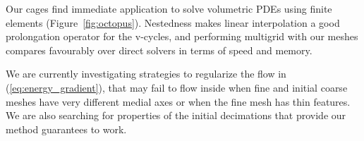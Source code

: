 \documentclass{cgyrf15}
\begin{document}
Our cages find immediate application to solve volumetric PDEs using finite
elements (Figure~\ref{fig:octopus}). Nestedness makes linear interpolation a
good prolongation operator for the v-cycles, and performing multigrid with our
meshes compares favourably over direct solvers in terms of speed and memory.


We are currently investigating strategies to regularize the flow in (\ref{eq:energy_gradient}),
that may fail to flow inside when fine and
initial coarse meshes have very different medial axes or when the fine mesh has
thin features. We are also searching for properties of the initial decimations that provide our method
guarantees to work. 



 
\end{document}
